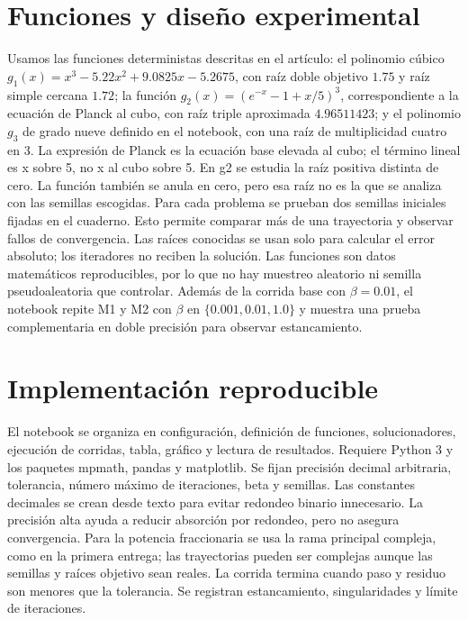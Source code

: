 \documentclass[10pt,a4paper]{article}
\begin{document}
\section{Funciones y dise\~no experimental}
Usamos las funciones deterministas descritas en el art\'iculo: el polinomio cúbico $g_1(x)=x^3-5.22x^2+9.0825x-5.2675$, con ra\'iz doble objetivo $1.75$ y ra\'iz simple cercana $1.72$; la funci\'on $g_2(x)=(e^{-x}-1+x/5)^3$, correspondiente a la ecuaci\'on de Planck al cubo, con ra\'iz triple aproximada $4.96511423$; y el polinomio $g_3$ de grado nueve definido en el notebook, con una ra\'iz de multiplicidad cuatro en $3$. La expresión de Planck es la ecuaci\'on base elevada al cubo; el término lineal es x sobre 5, no x al cubo sobre 5.
En g2 se estudia la raíz positiva distinta de cero. La función también se anula en cero, pero esa raíz no es la que se analiza con las semillas escogidas.
Para cada problema se prueban dos semillas iniciales fijadas en el cuaderno. Esto permite comparar más de una trayectoria y observar fallos de convergencia. Las ra\'ices conocidas se usan solo para calcular el error absoluto; los iteradores no reciben la solución. Las funciones son datos matemáticos reproducibles, por lo que no hay muestreo aleatorio ni semilla pseudoaleatoria que controlar. Además de la corrida base con $\beta=0.01$, el notebook repite M1 y M2 con $\beta$ en $\{0.001,0.01,1.0\}$ y muestra una prueba complementaria en doble precisi\'on para observar estancamiento.
\section{Implementación reproducible}
El notebook se organiza en configuración, definición de funciones, solucionadores, ejecución de corridas, tabla, gr\'afico y lectura de resultados. Requiere Python 3 y los paquetes mpmath, pandas y matplotlib. Se fijan precisi\'on decimal arbitraria, tolerancia, n\'umero m\'aximo de iteraciones, beta y semillas. Las constantes decimales se crean desde texto para evitar redondeo binario innecesario. La precisi\'on alta ayuda a reducir absorción por redondeo, pero no asegura convergencia.
Para la potencia fraccionaria se usa la rama principal compleja, como en la primera entrega; las trayectorias pueden ser complejas aunque las semillas y raíces objetivo sean reales. La corrida termina cuando paso y residuo son menores que la tolerancia. Se registran estancamiento, singularidades y límite de iteraciones.
\end{document}
